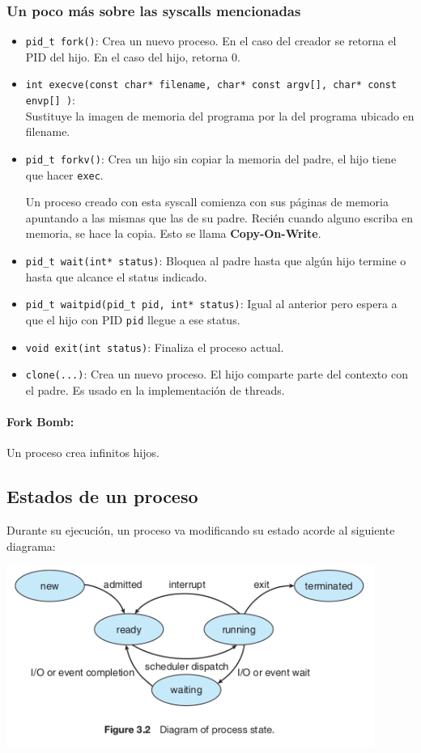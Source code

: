\subsubsection{Un poco más sobre las syscalls mencionadas}
\begin{itemize}
	\item \texttt{pid\_t fork()}: Crea un nuevo proceso. En el caso del creador se retorna el PID del hijo. En el caso del hijo, retorna 0.
	\item \texttt{int\ execve(const char* filename, char* const argv[], char* const envp[] )}: \\ Sustituye la imagen de memoria del programa por la del programa ubicado en filename.
	\item \texttt{pid\_t forkv()}: Crea un hijo sin copiar la memoria del padre, el hijo tiene que hacer \texttt{exec}.

	Un proceso creado con esta syscall comienza con sus páginas de memoria apuntando a las mismas que las de su padre. Recién cuando alguno escriba en memoria, se hace la copia. Esto se llama \textbf{Copy-On-Write}.

	\item \texttt{pid\_t wait(int* status)}: Bloquea al padre hasta que algún hijo termine o hasta que alcance el status indicado.
	\item \texttt{pid\_t waitpid(pid\_t pid, int* status)}: Igual al anterior pero espera a que el hijo con PID \texttt{pid} llegue a ese status.
	\item \texttt{void exit(int status)}: Finaliza el proceso actual.
	\item \texttt{clone(...)}: Crea un nuevo proceso. El hijo comparte parte del contexto con el padre. Es usado en la implementación de threads.
\end{itemize}

\paragraph{Fork Bomb:} Un proceso crea infinitos hijos.
\subsection{Estados de un proceso}
Durante su ejecución, un proceso va modificando su estado acorde al siguiente diagrama:

\begin{center}
	\vspace*{0.5cm}
	\includegraphics[width=0.9\textwidth]{imagenes/estados-proceso.png}
\end{center}

